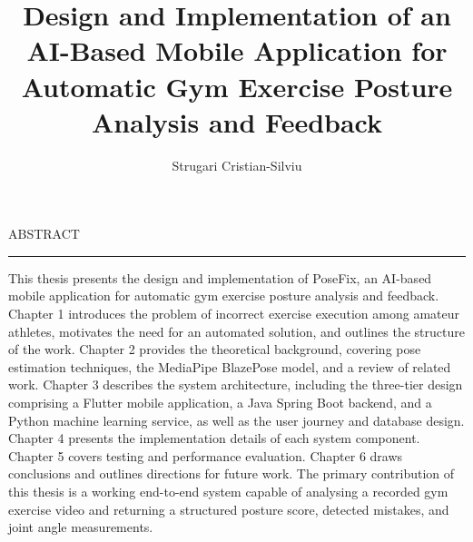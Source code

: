 \documentclass[12pt]{report}
\begin{document}
\title{Design and Implementation of an AI-Based Mobile Application for Automatic Gym Exercise Posture Analysis and Feedback}					   
\author{Strugari Cristian-Silviu}											
				
\maketitle

\newpage
\thispagestyle{empty}
\mbox{}
\newpage
{} 

\cleardoublepage
ABSTRACT
\vspace{0.5cm}	
\hrule
\vspace{0.5cm}	

This thesis presents the design and implementation of PoseFix, an AI-based mobile application for automatic gym exercise posture analysis and feedback. Chapter 1 introduces the problem of incorrect exercise execution among amateur athletes, motivates the need for an automated solution, and outlines the structure of the work. Chapter 2 provides the theoretical background, covering pose estimation techniques, the MediaPipe BlazePose model, and a review of related work. Chapter 3 describes the system architecture, including the three-tier design comprising a Flutter mobile application, a Java Spring Boot backend, and a Python machine learning service, as well as the user journey and database design. Chapter 4 presents the implementation details of each system component. Chapter 5 covers testing and performance evaluation. Chapter 6 draws conclusions and outlines directions for future work. The primary contribution of this thesis is a working end-to-end system capable of analysing a recorded gym exercise video and returning a structured posture score, detected mistakes, and joint angle measurements.

\tableofcontents

\newpage
{}










\end{document}
